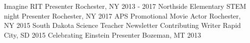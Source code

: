 \begin{cvhonors}
 \cvhonor
    {Imagine RIT}
    {Presenter}
    {Rochester, NY}
    {2013 - 2017}
 \cvhonor
    {Northside Elementary STEM night}
    {Presenter}
    {Rochester, NY}
    {2017}
  \cvhonor
    {APS Promotional Movie}
    {Actor}
    {Rochester, NY}
    {2015}
  \cvhonor
    {South Dakota Science Teacher Newsletter}
    {Contributing Writer}
    {Rapid City, SD}
    {2015}
  \cvhonor
    {Celebrating Einstein}
    {Presenter}
    {Bozeman, MT}
    {2013}
\end{cvhonors}
